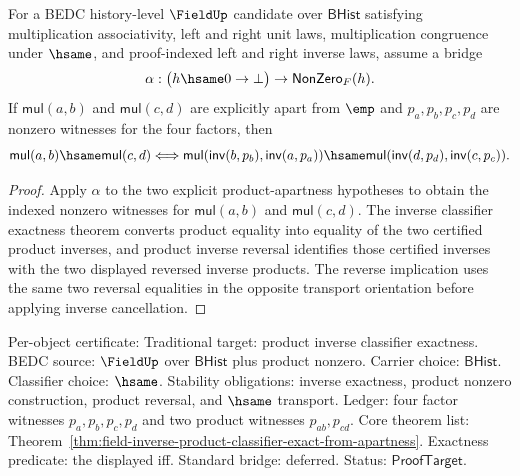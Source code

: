 \begin{theorem}
\label{thm:field-apart-product-inverse-classifier-exact-from-apartness}
For a BEDC history-level $\FieldUp$ candidate over $\mathsf{BHist}$ satisfying
multiplication associativity, left and right unit laws, multiplication
congruence under $\hsame$, and proof-indexed left and right inverse laws,
assume a bridge
$$
\alpha:\bigl(h\hsame0\to\bot\bigr)\to\mathsf{NonZero}_F(h).
$$
If $\mathsf{mul}(a,b)$ and $\mathsf{mul}(c,d)$ are explicitly apart from
$\emp$ and $p_a,p_b,p_c,p_d$ are nonzero witnesses for the four factors, then
$$
\mathsf{mul}(a,b)\hsame\mathsf{mul}(c,d) \Longleftrightarrow
\mathsf{mul}(\mathsf{inv}(b,p_b),\mathsf{inv}(a,p_a))\hsame
\mathsf{mul}(\mathsf{inv}(d,p_d),\mathsf{inv}(c,p_c)).
$$
\end{theorem}
\begin{proof}
Apply $\alpha$ to the two explicit product-apartness hypotheses to obtain
the indexed nonzero witnesses for $\mathsf{mul}(a,b)$ and
$\mathsf{mul}(c,d)$. The inverse classifier exactness theorem converts
product equality into equality of the two certified product inverses, and
product inverse reversal identifies those certified inverses with the two
displayed reversed inverse products. The reverse implication uses the same
two reversal equalities in the opposite transport orientation before applying
inverse cancellation.
\end{proof}

Per-object certificate: Traditional target: product inverse classifier
exactness. BEDC source: $\FieldUp$ over $\mathsf{BHist}$ plus product nonzero.
Carrier choice: $\mathsf{BHist}$. Classifier choice: $\hsame$. Stability
obligations: inverse exactness, product nonzero construction, product reversal,
and $\hsame$ transport. Ledger: four factor witnesses $p_a,p_b,p_c,p_d$ and two
product witnesses $p_{ab},p_{cd}$. Core theorem list:
Theorem~\ref{thm:field-inverse-product-classifier-exact-from-apartness}.
Exactness predicate: the displayed iff. Standard bridge: deferred. Status:
$\mathsf{ProofTarget}$.

